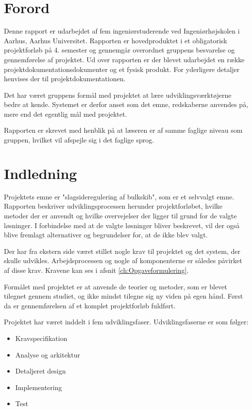 \chapter{Forord}
\label{ch:forord}
Denne rapport er udarbejdet af fem ingeniørstuderende ved Ingeniørhøjskolen i Aarhus, Aarhus Universitet. Rapporten er hovedproduktet i et obligatorisk projektforløb på 4. semester og gennemgår overordnet gruppens besvarelse og gennemførelse af projektet. Ud over rapporten er der blevet udarbejdet en række projektdokumentationsdokumenter og et fysisk produkt. For yderligere detaljer henvises der til projektdokumentationen.

Det har været gruppens formål med projektet at lære udviklingsværktøjerne bedre at kende. Systemet er derfor anset som det emne, redskaberne anvendes på, mere end det egentlig mål med projektet.
 
Rapporten er skrevet med henblik på at læseren er af samme faglige niveau som gruppen, hvilket vil afspejle sig i det faglige sprog. 

\chapter{Indledning}
Projektets emne er "slagsideregulering af bulkskib", som er et selvvalgt emne. Rapporten beskriver udviklingsprocessen herunder projektforløbet, hvilke metoder der er anvendt og hvilke overvejelser der ligger til grund for de valgte løsninger. I forbindelse med at de valgte løsninger bliver beskrevet, vil der også blive fremlagt alternativer og begrundelser for, at de ikke blev valgt. 

Der har fra ekstern side været stillet nogle krav til projektet og det system, der skulle udvikles. Arbejdsprocessen og nogle af komponenterne er således påvirket af disse krav. Kravene kan ses i afsnit \ref{ch:Opgaveformulering}.

Formålet med projektet er at anvende de teorier og metoder, som er blevet tilegnet gennem studiet, og ikke mindst tilegne sig ny viden på egen hånd. Først da er gennemførelsen af et komplet projektforløb fuldført.

Projektet har været inddelt i fem udviklingsfaser. Udviklingsfaserne er som følger:
\begin{itemize}
\item Kravspecifikation
\item Analyse og arkitektur
\item Detaljeret design
\item Implementering
\item Test
\end{itemize}


